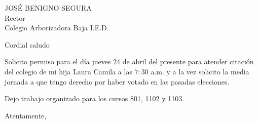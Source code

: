 \documentclass[letterpaper,spanish,11pt]{letter}
\begin{document}
\begin{letter}{JOSÉ BENIGNO SEGURA\\Rector\\Colegio Arborizadora Baja I.E.D.}
	
\opening{Cordial saludo}

Solicito permiso para el día jueves $24$ de abril del presente para atender citación del colegio de mi hija Laura Camila a las $7:30$ a.m. y a la vez solicito la media jornada a que tengo derecho por haber votado en las pasadas elecciones.

Dejo trabajo organizado para los cursos 801, 1102 y 1103.

\closing{Atentamente,}


\end{letter}
\end{document}
